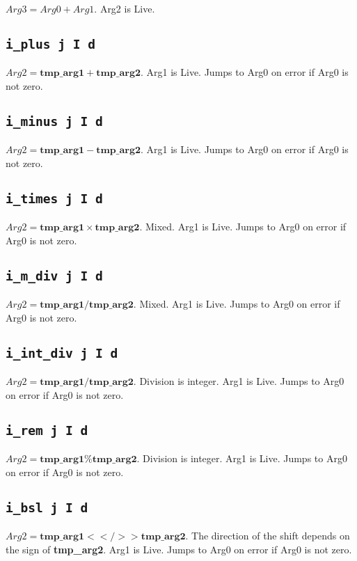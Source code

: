 \documentclass{article}
\newcommand{\tmpa}{\textbf{tmp\_arg1}}
\newcommand{\tmpb}{\textbf{tmp\_arg2}}
\newcommand{\iop}[1]{\texttt{#1}}
\begin{document}
$Arg3 = Arg0 + Arg1$. Arg2 is Live.

\subsection*{\iop{i\_plus j I d}}

$Arg2 = \tmpa{} + \tmpb{}$. Arg1 is Live. Jumps to Arg0 on error if Arg0 is not
zero.

\subsection*{\iop{i\_minus j I d}}

$Arg2 = \tmpa{} - \tmpb{}$. Arg1 is Live. Jumps to Arg0 on error if Arg0 is not
zero.

\subsection*{\iop{i\_times j I d}}

$Arg2 = \tmpa{} \times \tmpb{}$. Mixed. Arg1 is Live. Jumps to Arg0 on error if Arg0 is
not zero.

\subsection*{\iop{i\_m\_div j I d}}

$Arg2 = \tmpa{} / \tmpb{}$. Mixed. Arg1 is Live. Jumps to Arg0 on error if Arg0 is
not zero.

\subsection*{\iop{i\_int\_div j I d}}

$Arg2 = \tmpa{} / \tmpb{}$. Division is integer. Arg1 is Live. Jumps to Arg0 on
error if Arg0 is not zero.

\subsection*{\iop{i\_rem j I d}}

$Arg2 = \tmpa{} \% \tmpb{}$. Division is integer. Arg1 is Live. Jumps to Arg0 on
error if Arg0 is not zero.

\subsection*{\iop{i\_bsl j I d}}

$Arg2 = \tmpa{} <</>> \tmpb{}$. The direction of the shift depends on the sign of
\tmpb{}. Arg1 is Live. Jumps to Arg0 on error if Arg0 is not zero.
\end{document}
